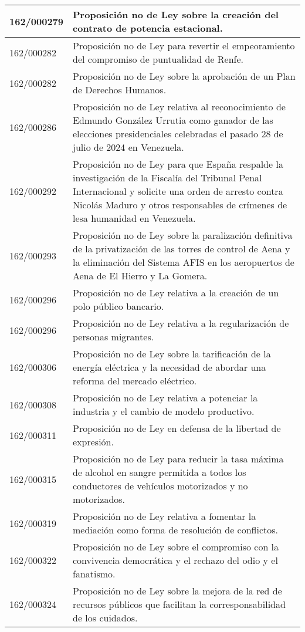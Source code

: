 {\begin{table}[H]
\begin{center}
\begin{tabularx}{\linewidth}{| l | X |}
\hline
162/000279 & Proposición no de Ley sobre la creación del contrato de potencia estacional. \\
\hline
162/000282 & Proposición no de Ley para revertir el empeoramiento del compromiso de puntualidad de Renfe. \\
\hline
162/000282 & Proposición no de Ley sobre la aprobación de un Plan de Derechos Humanos. \\
\hline
162/000286 & Proposición no de Ley relativa al reconocimiento de Edmundo González Urrutia como ganador de las elecciones presidenciales celebradas el pasado 28 de julio de 2024 en Venezuela. \\
\hline
162/000292 & Proposición no de Ley para que España respalde la investigación de la Fiscalía del Tribunal Penal Internacional y solicite una orden de arresto contra Nicolás Maduro y otros responsables de crímenes de lesa humanidad en Venezuela. \\
\hline
162/000293 & Proposición no de Ley sobre la paralización definitiva de la privatización de las torres de control de Aena y la eliminación del Sistema AFIS en los aeropuertos de Aena de El Hierro y La Gomera. \\
\hline
162/000296 & Proposición no de Ley relativa a la creación de un polo público bancario. \\
\hline
162/000296 & Proposición no de Ley relativa a la regularización de personas migrantes. \\
\hline
162/000306 & Proposición no de Ley sobre la tarificación de la energía eléctrica y la necesidad de abordar una reforma del mercado eléctrico. \\
\hline
162/000308 & Proposición no de Ley relativa a potenciar la industria y el cambio de modelo productivo. \\
\hline
162/000311 & Proposición no de Ley en defensa de la libertad de expresión. \\
\hline
162/000315 & Proposición no de Ley para reducir la tasa máxima de alcohol en sangre permitida a todos los conductores de vehículos motorizados y no motorizados. \\
\hline
162/000319 & Proposición no de Ley relativa a fomentar la mediación como forma de resolución de conflictos. \\
\hline
162/000322 & Proposición no de Ley sobre el compromiso con la convivencia democrática y el rechazo del odio y el fanatismo. \\
\hline
162/000324 & Proposición no de Ley sobre la mejora de la red de recursos públicos que facilitan la corresponsabilidad de los cuidados. \\

\end{tabularx}
\end{center}
\end{table}}
